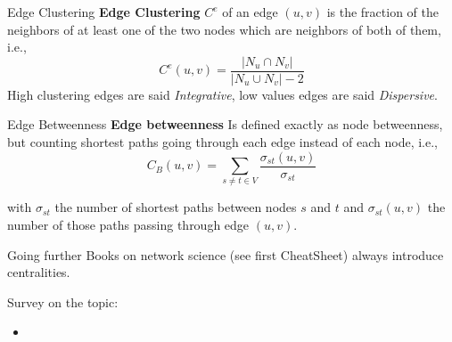 \begin{textbox}{Edge Clustering}
    \textbf{Edge Clustering} $C^e$ of an edge $(u,v)$ is the fraction of the neighbors of at least one of the two nodes which are neighbors of both of them, i.e.,
    \[
        C^e(u,v)=\frac{|N_u \cap N_v|}{|N_u \cup N_v|-2}
    \]
    High clustering edges are said \textit{Integrative}, low values edges are said \textit{Dispersive}.
\end{textbox}


\begin{textbox}{Edge Betweenness}
    \textbf{Edge betweenness} Is defined exactly as node betweenness, but counting shortest paths going through each edge instead of each node, i.e.,
    \[ C_{B}(u,v)=\sum _{s\neq t\in V}{\frac {\sigma _{st}(u,v)}{\sigma _{st}}}\]

    with $\sigma _{st}$ the number of shortest paths between nodes $s$ and $t$ and $\sigma _{st}(u,v)$ the number of those paths passing through edge $(u,v)$.
\end{textbox}





\begin{textbox}{Going further}
    Books on network science (see first CheatSheet) always introduce centralities.

    Survey on the topic:
    \begin{itemize}
        \item \cite{rodrigues2019network}
    \end{itemize}
\end{textbox}